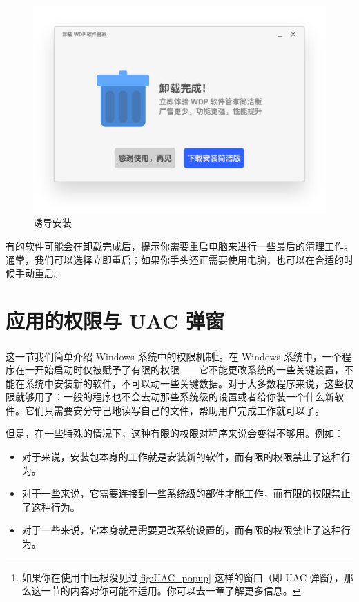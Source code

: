 \begin{figure}[htb!]
  \centering
  \includegraphics[width=.6\textwidth]{assets/basic/WDP_software_manager.pdf}
  \caption{诱导安装}
  \label{Confusing_Uninstall}
\end{figure}

有的软件可能会在卸载完成后，提示你需要重启电脑来进行一些最后的清理工作。通常，我们可以选择立即重启；如果你手头还正需要使用电脑，也可以在合适的时候手动重启。

\section{应用的权限与 UAC 弹窗}

这一节我们简单介绍 Windows 系统中的权限机制\footnote{如果你在使用中压根没见过\autoref{fig:UAC_popup} 这样的窗口（即 UAC 弹窗），那么这一节的内容对你可能不适用。你可以去一章了解更多信息。}。在 Windows 系统中，一个程序在一开始启动时仅被赋予了有限的权限——它不能更改系统的一些关键设置，不能在系统中安装新的软件，不可以动一些关键数据。对于大多数程序来说，这些权限就够用了：一般的程序也不会去动那些系统级的设置或者给你装一个什么新软件。它们只需要安分守己地读写自己的文件，帮助用户完成工作就可以了。

但是，在一些特殊的情况下，这种有限的权限对程序来说会变得不够用。例如：

\begin{itemize}
  \item 对于来说，安装包本身的工作就是安装新的软件，而有限的权限禁止了这种行为。
  \item 对于一些来说，它需要连接到一些系统级的部件才能工作，而有限的权限禁止了这种行为。
  \item 对于一些来说，它本身就是需要更改系统设置的，而有限的权限禁止了这种行为。
\end{itemize}

